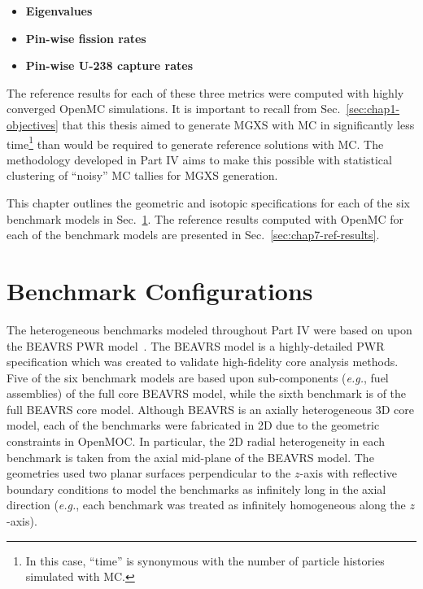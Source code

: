\begin{itemize}[noitemsep,topsep=0pt]
  \item \textbf{Eigenvalues}
  \item \textbf{Pin-wise fission rates}
  \item \textbf{Pin-wise U-238 capture rates}
\end{itemize}

\noindent The reference results for each of these three metrics were computed with highly converged OpenMC simulations. It is important to recall from Sec.~\ref{sec:chap1-objectives} that this thesis aimed to generate \ac{MGXS} with \ac{MC} in significantly less time\footnote{In this case, ``time'' is synonymous with the number of particle histories simulated with \ac{MC}.} than would be required to generate reference solutions with \ac{MC}. The methodology developed in Part IV aims to make this possible with statistical clustering of ``noisy'' \ac{MC} tallies for \ac{MGXS} generation.

This chapter outlines the geometric and isotopic specifications for each of the six benchmark models in Sec.~\ref{sec:chap7-benchmarks}. The reference results computed with OpenMC for each of the benchmark models are presented in Sec.~\ref{sec:chap7-ref-results}.


\section{Benchmark Configurations}
\label{sec:chap7-benchmarks}

The heterogeneous benchmarks modeled throughout Part IV were based on upon the \ac{BEAVRS} \ac{PWR} model~\cite{horelik2013beavrs}. The \ac{BEAVRS} model is a highly-detailed \ac{PWR} specification which was created to validate high-fidelity core analysis methods. Five of the six benchmark models are based upon sub-components (\textit{e.g.}, fuel assemblies) of the full core \ac{BEAVRS} model, while the sixth benchmark is of the full \ac{BEAVRS} core model. Although \ac{BEAVRS} is an axially heterogeneous 3D core model, each of the benchmarks were fabricated in 2D due to the geometric constraints in OpenMOC. In particular, the 2D radial heterogeneity in each benchmark is taken from the axial mid-plane of the \ac{BEAVRS} model. The geometries used two planar surfaces perpendicular to the $z$-axis with reflective boundary conditions to model the benchmarks as infinitely long in the axial direction (\textit{e.g.}, each benchmark was treated as infinitely homogeneous along the $z$-axis).

